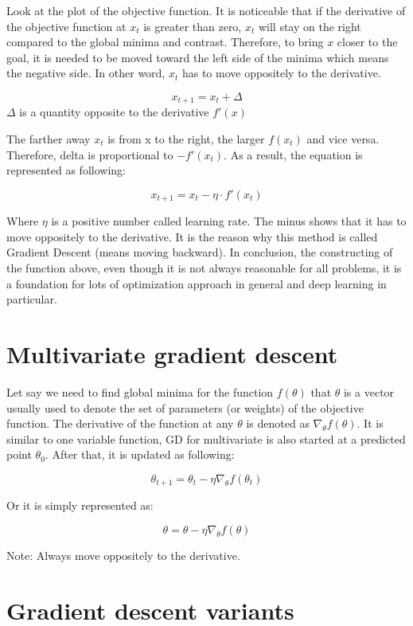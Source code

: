 	Look at the plot of the objective function. It is noticeable that if the derivative of the objective function at $x_t$ is greater than zero, $x_t$ will stay on the right compared to the global minima and contrast. Therefore, to bring $x$ closer to the goal, it is needed to be moved toward the left side of the minima which means the negative side. In other word, $x_t$ has to move oppositely to the derivative.  
	
	\[x_{t+1} = x_t + \Delta \] $\Delta$ is a quantity opposite to the derivative $f'(x)$
	
	\noindent	
	The farther away $x_t$ is from x to the right, the larger $f(x_t)$ and vice versa. Therefore, delta is proportional to $-f'(x_t)$.
	\noindent	
	As a result, the equation is represented as following:
	
	\[x_{t+1} = x_t - \eta \cdot f'(x_t)\]
	
	Where $\eta$ is a positive number called learning rate. The minus shows that it has to move oppositely to the derivative. It is the reason why this method is called Gradient Descent (means moving backward). In conclusion, the constructing of the function above, even though it is not always reasonable for all problems, it is a foundation for lots of optimization approach in general and deep learning in particular.
	
\section{Multivariate gradient descent}
\label{section:multivariateGD}
\noindent
	
	Let say we need to find global minima for the function $f(\theta)$ that $\theta$ is a vector usually used to denote the set of parameters (or weights) of the objective function. The derivative of the function at any $\theta$ is denoted as $\nabla_{\theta}f(\theta)$. It is similar to one variable function, GD for multivariate is also started at a predicted point $\theta_0$. After that, it is updated as following:
	
	\[\theta_{t+1} = \theta_t - \eta\nabla_{\theta}f(\theta_t) \]
	
	\noindent	
	Or it is simply represented as:
	
	\[\theta = \theta - \eta\nabla_{\theta}f(\theta) \]
	
	\noindent
	Note: Always move oppositely to the derivative.
	
\section{Gradient descent variants}
	\label{section:GDvariants}
	\noindent
	
